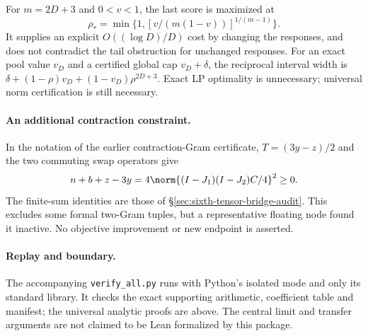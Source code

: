 For $m=2D+3$ and $0<v<1$, the last score is maximized at
\[
 \rho_* =\min\{1,[v/(m(1-v))]^{1/(m-1)}\}.
\]
It supplies an explicit $O((\log D)/D)$ cost by changing the responses,
and does not contradict the tail obstruction for unchanged responses.
For an exact pool value $v_D$ and a certified global cap $v_D+\delta$,
the reciprocal interval width is
$\delta+(1-\rho)v_D+(1-v_D)\rho^{2D+3}$.
Exact LP optimality is unnecessary; universal norm certification is
still necessary.

\paragraph{An additional contraction constraint.}
In the notation of the earlier contraction-Gram certificate,
$T=(3y-z)/2$ and the two commuting swap operators give
\[
 n+b+z-3y=4\norm{(I-J_1)(I-J_2)C/4}^2\ge0.
\]
The finite-sum identities are those of
\S\ref{sec:sixth-tensor-bridge-audit}. This excludes some formal
two-Gram tuples, but a representative floating node found it inactive.
No objective improvement or new endpoint is asserted.

\paragraph{Replay and boundary.}
The accompanying \texttt{verify\_all.py} runs with Python's isolated
mode and only its standard library. It checks the exact supporting
arithmetic, coefficient table and manifest; the universal analytic
proofs are above. The central limit and transfer arguments are not
claimed to be Lean formalized by this package.
